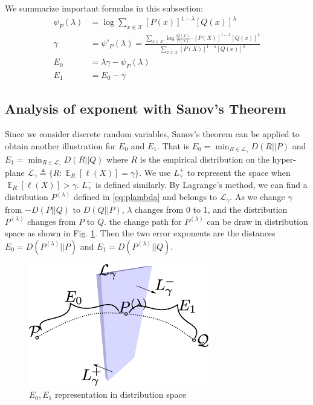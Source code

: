 \documentclass{article}
\DeclareMathOperator{\E}{\mathbb{E}}
\begin{document}
We summarize important formulas in this subsection:
\begin{align}\label{eq:cramer_important}
    \psi_P(\lambda)&=\log \sum_{x\in\mathcal{X}}
[P(x)]^{1-\lambda}[Q(x)]^{\lambda} \\
    \gamma &= \psi'_P(\lambda)= \frac{\sum_{x\in\mathcal{X}}
\log\frac{Q(x)}{P(x)}\cdot[P(X)]^{1-\lambda}[Q(x)]^{\lambda}}
{\sum_{x\in\mathcal{X}}
[P(X)]^{1-\lambda}[Q(x)]^{\lambda}} \\
E_0 &= \lambda \gamma - \psi_P(\lambda) \\
E_1 & = E_0 - \gamma
\end{align}
\subsection{Analysis of exponent with Sanov's Theorem}
Since we consider discrete random variables, Sanov's theorem
can be applied to obtain another illustration for $E_0$
and $E_1$.
That is $E_0 = \min_{R\in \mathcal{L}_{\gamma}}D(R || P)$ and $E_1=\min_{R\in \mathcal{L}_{\gamma}}D(R ||Q)$ where
$R$ is the empirical distribution on the hyper-plane
$\mathcal{L}_{\gamma}\triangleq\{R: \E_R[\ell(X)]=\gamma \}$.
We use $L_{\gamma}^+$ to represent the space when
$\E_R[\ell(X)]>\gamma$. $L_{\gamma}^-$
is defined similarly.
By Lagrange's method, we can find a distribution $P^{(\lambda)}$
defined in \eqref{eq:plambda} and belongs to $\mathcal{L}_{\gamma}$.
As we change $\gamma$ from $-D(P||Q)$ to $D(Q||P)$, $\lambda$ changes
from $0$ to $1$, and the distribution $P^{(\lambda)}$ changes from
$P$ to $Q$. the change path for $P^{(\lambda)}$ can be draw in
distribution space as shown in Fig. \ref{fig:ds}.
Then the two error exponents are the distances
$E_0 = D(P^{(\lambda)} || P)$ and $E_1=D(P^{(\lambda)} ||Q)$.
\begin{figure}
    \centering
    \includegraphics[width=0.7\textwidth]{distributional_space.eps}
    \caption{$E_0, E_1$ representation in distribution space}
    \label{fig:ds}
\end{figure}
\end{document}
